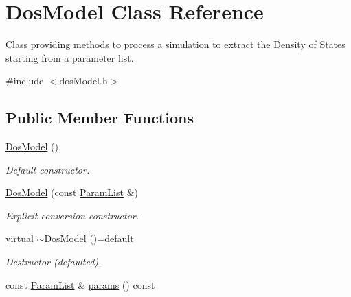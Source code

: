 \hypertarget{classDosModel}{\section{Dos\-Model Class Reference}
\label{classDosModel}
}


Class providing methods to process a simulation to extract the Density of States starting from a parameter list.  




{\ttfamily \#include $<$dos\-Model.\-h$>$}

\subsection*{Public Member Functions}
\begin{DoxyCompactItemize}
\item 
\hypertarget{classDosModel_a500b55ef4d49a883dbe2ea137e85c839}{\hyperlink{classDosModel_a500b55ef4d49a883dbe2ea137e85c839}{Dos\-Model} ()}\label{classDosModel_a500b55ef4d49a883dbe2ea137e85c839}

\begin{DoxyCompactList}\small\item\em Default constructor. \end{DoxyCompactList}\item 
\hyperlink{classDosModel_a34d929790447adf8aae840519e1c8284}{Dos\-Model} (const \hyperlink{classParamList}{Param\-List} \&)
\begin{DoxyCompactList}\small\item\em Explicit conversion constructor. \end{DoxyCompactList}\item 
\hypertarget{classDosModel_a5361d0f34ccc062eef4564226f765aee}{virtual \hyperlink{classDosModel_a5361d0f34ccc062eef4564226f765aee}{$\sim$\-Dos\-Model} ()=default}\label{classDosModel_a5361d0f34ccc062eef4564226f765aee}

\begin{DoxyCompactList}\small\item\em Destructor (defaulted). \end{DoxyCompactList}\item 
\hypertarget{classDosModel_a5fd763c7e4ba5d643fdaa061ff3c506a}{const \hyperlink{classParamList}{Param\-List} \& \hyperlink{classDosModel_a5fd763c7e4ba5d643fdaa061ff3c506a}{params} () const }\label{classDosModel_a5fd763c7e4ba5d643fdaa061ff3c506a}


\end{DoxyCompactItemize}
